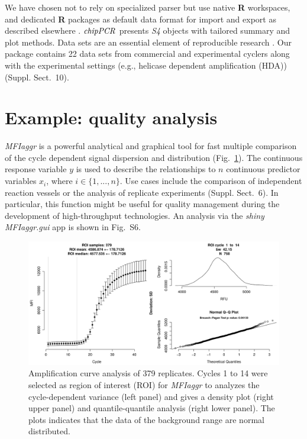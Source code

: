 \documentclass{bioinfo}
\begin{document}
\begin{methods}
We have chosen not to rely on specialized parser but use native \textbf{R} 
workspaces, and dedicated \textbf{R} packages as default data format for import 
and export as described elsewhere \citep{perkins_2012, RCT_2013}. 
$\emph{chipPCR}$ presents \emph{S4} objects with tailored summary and plot 
methods. Data sets are an essential element of reproducible research 
\citep{Leeper_2014}. Our package contains 22 data sets from commercial and 
experimental cyclers along with the experimental settings (e.g., helicase 
dependent amplification (HDA)) (Suppl. Sect.~10). %
\end{methods}

\section{Example: quality analysis}

\textsl{MFIaggr} is a powerful analytical and graphical tool for fast multiple 
comparison of the cycle dependent signal dispersion and distribution 
(Fig.~\ref{fig:01}). The continuous response variable $y$ is used to describe 
the relationships to $n$ continuous predictor variables $x_i$, where $i \in \{1, 
..., n\}$. Use cases include the comparison of independent reaction vessels or 
the analysis of replicate experiments (Suppl. Sect.~6). In %
particular, this function might be useful for quality management during the 
development of high-throughput technologies. An analysis via the \emph{shiny} 
\textsl{MFIaggr.gui} app is shown in Fig.~S6. %

\begin{figure}[!tpb]%
\centerline{\includegraphics{fig01.jpg}}
\caption{Amplification curve analysis of 379 replicates. Cycles 1 to 14 were 
selected as region of interest (ROI) for \textsl{MFIaggr} to analyzes the 
cycle-dependent variance (left panel) and gives a density plot (right upper 
panel) and quantile-quantile analysis (right lower panel). The plots indicates 
that the data of the background range are normal distributed.}\label{fig:01}
\end{figure}
\end{document}
